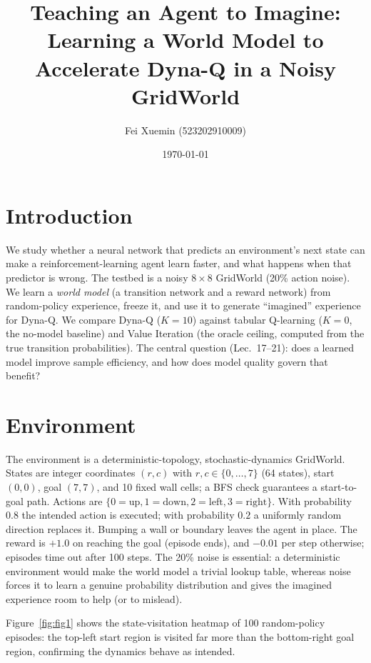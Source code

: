 \documentclass[11pt]{article}
\title{Teaching an Agent to Imagine:\\
       Learning a World Model to Accelerate Dyna-Q in a Noisy GridWorld}
\author{%
        Fei Xuemin (523202910009)}
\date{\today}
\begin{document}
\maketitle

\section{Introduction}\label{sec:intro}
We study whether a neural network that predicts an environment's next state
can make a reinforcement-learning agent learn faster, and what happens when
that predictor is wrong. The testbed is a noisy $8\times8$ GridWorld
(20\% action noise). We learn a \emph{world model} (a transition network and a
reward network) from random-policy experience, freeze it, and use it to
generate ``imagined'' experience for Dyna-Q. We compare Dyna-Q ($K{=}10$)
against tabular Q-learning ($K{=}0$, the no-model baseline) and Value Iteration
(the oracle ceiling, computed from the true transition probabilities). The
central question (Lec.~17--21): does a learned model improve sample efficiency,
and how does model quality govern that benefit?



\section{Environment}\label{sec:env}
The environment is a deterministic-topology, stochastic-dynamics GridWorld.
States are integer coordinates $(r,c)$ with $r,c\in\{0,\dots,7\}$ (64 states),
start $(0,0)$, goal $(7,7)$, and 10 fixed wall cells; a BFS check guarantees a
start-to-goal path. Actions are $\{0{=}\text{up},1{=}\text{down},
2{=}\text{left},3{=}\text{right}\}$. With probability $0.8$ the intended action
is executed; with probability $0.2$ a uniformly random direction replaces it.
Bumping a wall or boundary leaves the agent in place. The reward is $+1.0$ on
reaching the goal (episode ends), and $-0.01$ per step otherwise; episodes time
out after 100 steps. The 20\% noise is essential: a deterministic environment
would make the world model a trivial lookup table, whereas noise forces it to
learn a genuine probability distribution and gives the imagined experience room
to help (or to mislead).

Figure~\ref{fig:fig1} shows the state-visitation heatmap of 100 random-policy
episodes: the top-left start region is visited far more than the bottom-right
goal region, confirming the dynamics behave as intended.
\end{document}
